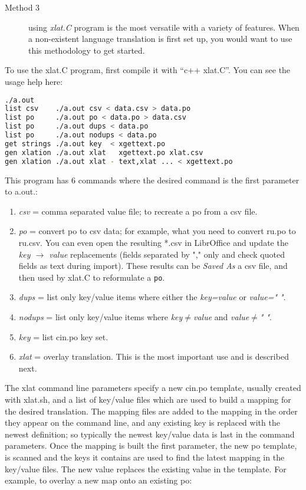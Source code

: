 \begin{description}
	\item[Method 3 ] using \textit{xlat.C} program is the most versatile with a variety of features.  When a non-existent language translation is first set up, you would want to use this methodology to get started.
\end{description}

To use the xlat.C program, first compile it with “c++ xlat.C”.  You can see the usage help here:

\begin{lstlisting}[language=bash]
	./a.out 
list csv    ./a.out csv < data.csv > data.po
list po     ./a.out po < data.po > data.csv
list po     ./a.out dups < data.po
list po     ./a.out nodups < data.po
get strings ./a.out key  < xgettext.po
gen xlation ./a.out xlat   xgettext.po xlat.csv
gen xlation ./a.out xlat - text,xlat ... < xgettext.po
\end{lstlisting}

This program has 6 commands where the desired command is the first parameter to a.out.:

\begin{enumerate}
	\item \textit{csv} = comma separated value file; to recreate a po from a csv file.
	\item \textit{po}  = convert po to csv data;  for example, what you need to convert ru.po to ru.csv.
	You can even open the resulting *.csv in LibrOffice and update the \textit{key $\rightarrow$ value} replacements
	(fields separated by "," only and check quoted fields as text during import).  These results can
	be \textit{Saved As} a csv file, and then used by xlat.C to reformulate a \texttt{po}.
	\item \textit{dups} = list only key/value items where either the \textit{key=value} or \textit{value=" "}.
	\item \textit{nodups} = list only key/value items where \textit{key$\ne$value} and \textit{value$\ne$" "}.
	\item \textit{key} = list cin.po key set.
	\item \textit{xlat} = overlay translation.  This is the most important use and is described next.
\end{enumerate}

The xlat command line parameters specify a new cin.po template, usually created with xlat.sh, and a list of key/value files which are used to build a mapping for the desired translation.  The mapping files are added to the mapping in the order they appear on the command line, and any existing key is replaced with the newest definition; so typically the newest key/value data is last in the command parameters.  Once the mapping is built the first parameter, the new po template, is scanned and the keys it contains are used to find the latest mapping in the key/value files.  The new value replaces the existing value in the template.  For example, to overlay a new map onto an existing po:

